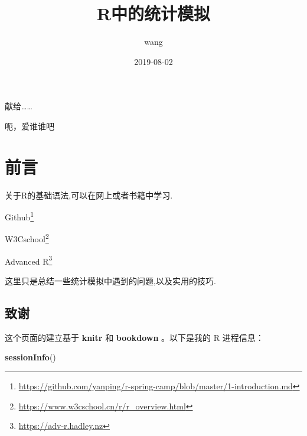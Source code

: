 \documentclass[]{ctexbook}
\title{R中的统计模拟}
\author{wang}
\date{2019-08-02}
\newenvironment{Shaded}{\begin{snugshade}}{\end{snugshade}}
\newcommand{\KeywordTok}[1]{\textcolor[rgb]{0.13,0.29,0.53}{\textbf{#1}}}
\newcommand{\NormalTok}[1]{#1}
\renewcommand{\href}[2]{#2\footnote{\url{#1}}}
\begin{document}
\maketitle


\thispagestyle{empty}

\begin{center}
献给……

呃，爱谁谁吧
\end{center}

\setlength{\abovedisplayskip}{-5pt}
\setlength{\abovedisplayshortskip}{-5pt}

{
\setcounter{tocdepth}{2}
\tableofcontents
}
\listoftables
\listoffigures
\hypertarget{section}{%
\chapter*{前言}\label{section}}


关于R的基础语法,可以在网上或者书籍中学习.

\href{https://github.com/yanping/r-spring-camp/blob/master/1-introduction.md}{Github}

\href{https://www.w3cschool.cn/r/r_overview.html}{W3Cschool}

\href{https://adv-r.hadley.nz}{Advanced R}

这里只是总结一些统计模拟中遇到的问题,以及实用的技巧.

\hypertarget{section-1}{%
\section*{致谢}\label{section-1}}


这个页面的建立基于 \textbf{knitr} \citep{xie2015}和 \textbf{bookdown} \citep{R-bookdown}。以下是我的 R 进程信息：

\begin{Shaded}
\begin{Highlighting}[]
\KeywordTok{sessionInfo}\NormalTok{()}
\end{Highlighting}
\end{Shaded}
\end{document}
